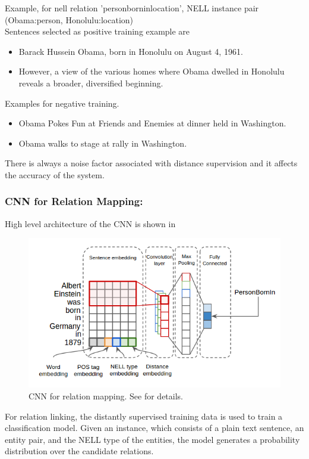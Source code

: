 Example, for nell relation 'personborninlocation', NELL instance pair (Obama:person, Honolulu:location)\\
Sentences selected as positive training example are\\
\begin{itemize}
 \item Barack Hussein Obama, born in Honolulu on August 4, 1961.\\
 \item However, a view of the various homes where Obama dwelled in Honolulu reveals a broader, diversified beginning.\\
\end{itemize}
Examples for negative training.\\
\begin{itemize}
 \item Obama Pokes Fun at Friends and Enemies at dinner held in Washington.\\
 \item Obama walks to stage at rally in Washington.\\
\end{itemize}

There is always a noise factor associated with distance supervision and it affects the accuracy of the system. 

\subsubsection{CNN for Relation Mapping:}
High level architecture of the CNN is shown in 
\begin{figure}[!htbp]
\begin{center}
\includegraphics[scale= 1]{images/CNN.png}
\end{center}
\caption{CNN for relation mapping. See  for details.}
\label{fig:cnn}
\end{figure}
For relation linking, the distantly supervised training data is used to train a classification model. Given an instance, which consists of a plain text sentence, an entity pair, and the NELL type of the entities, the model generates a probability distribution over the candidate relations. 


